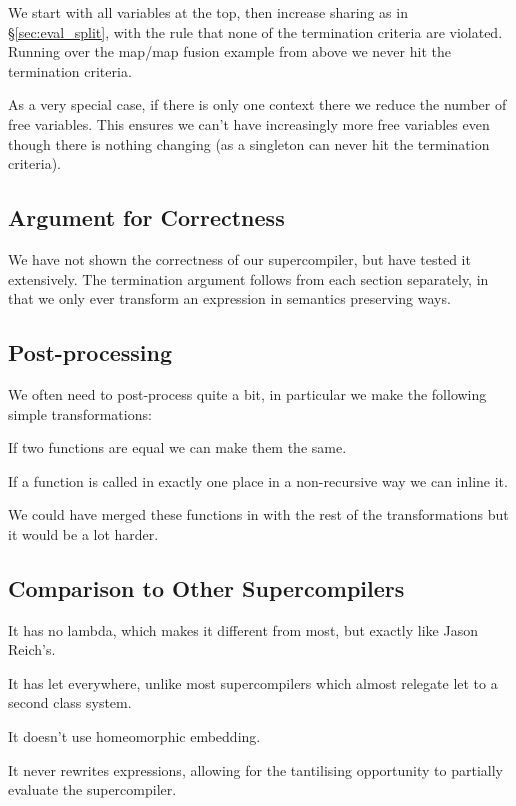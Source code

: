 \documentclass{sigplanconf}
\begin{document}
We start with all variables at the top, then increase sharing as in \S\ref{sec:eval_split}, with the rule that none of the termination criteria are violated. Running over the map/map fusion example from above we never hit the termination criteria.

As a very special case, if there is only one context there we reduce the number of free variables. This ensures we can't have increasingly more free variables even though there is nothing changing (as a singleton can never hit the termination criteria).

\subsection{Argument for Correctness}

We have not shown the correctness of our supercompiler, but have tested it extensively. The termination argument follows from each section separately, in that we only ever transform an expression in semantics preserving ways.

\subsection{Post-processing}
\label{sec:postprocess}

We often need to post-process quite a bit, in particular we make the following simple transformations:

If two functions are equal we can make them the same.

If a function is called in exactly one place in a non-recursive way we can inline it.

We could have merged these functions in with the rest of the transformations but it would be a lot harder.

\subsection{Comparison to Other Supercompilers}
\label{sec:comparison}

It has no lambda, which makes it different from most, but exactly like Jason Reich's.

It has let everywhere, unlike most supercompilers which almost relegate let to a second class system.

It doesn't use homeomorphic embedding.

It never rewrites expressions, allowing for the tantilising opportunity to partially evaluate the supercompiler.
\end{document}
